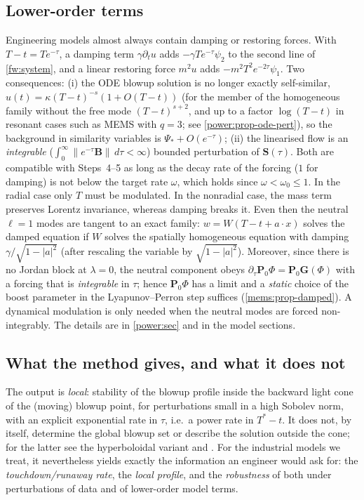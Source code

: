 \subsection{Lower-order terms}\label{fw:subsec-lower}
Engineering models almost always contain damping or restoring forces. With
$T-t=Te^{-\tau}$, a damping term $\gamma\partial_tu$ adds
$-\gamma Te^{-\tau}\psi_2$ to the second line of \eqref{fw:system}, and a
linear restoring force $m^2u$ adds $-m^2T^2e^{-2\tau}\psi_1$. Two
consequences: (i) the ODE blowup solution is no longer exactly self-similar,
$u(t)=\kappa(T-t)^{-s}(1+O(T-t))$ (for the member of the homogeneous family
without the free mode $(T-t)^{s+2}$, and up to a factor $\log(T-t)$ in
resonant cases such as MEMS with $q=3$; see \cref{power:prop-ode-pert}), so
the background in similarity variables is $\Psi_*+O(e^{-\tau})$; (ii) the linearised flow is an \emph{integrable}
($\int_0^\infty\|e^{-\tau}\mathbf B\|\,d\tau<\infty$) bounded perturbation of
$\mathbf S(\tau)$. Both are compatible with Steps~4--5 as long as the decay rate
of the forcing ($1$ for damping) is not below the target rate $\omega$, which
holds since $\omega<\omega_0\le1$. In the radial case only $T$ must be
modulated. In the nonradial case, the mass term preserves Lorentz
invariance, whereas damping breaks it. Even then the neutral $\ell=1$ modes
are tangent to an exact family: $w=W(T-t+a\cdot x)$ solves the damped
equation if $W$ solves the spatially homogeneous equation with damping
$\gamma/\sqrt{1-|a|^2}$ (after rescaling the variable by $\sqrt{1-|a|^2}$).
Moreover, since there is no Jordan block at $\lambda=0$, the neutral
component obeys $\partial_\tau\mathbf P_0\Phi=\mathbf P_0\mathbf G(\Phi)$
with a forcing that is \emph{integrable} in $\tau$; hence $\mathbf P_0\Phi$
has a limit and a \emph{static} choice of the boost parameter in the
Lyapunov--Perron step suffices (\cref{mems:prop-damped}). A dynamical
modulation is only needed when the neutral modes are forced
non-integrably. The details are in \cref{power:sec} and in the model
sections.

\subsection{What the method gives, and what it does not}
The output is \emph{local}: stability of the blowup profile inside the
backward light cone of the (moving) blowup point, for perturbations small in
a high Sobolev norm, with an explicit exponential rate in $\tau$, i.e.\ a
power rate in $T^*-t$. It does not, by itself, determine the global blowup
set or describe the solution outside the cone; for the latter see the
hyperboloidal variant \cite{BiernatDonningerSchoerkhuber2021} and
\cite{ChenEtAl2024}. For the industrial models
we treat, it nevertheless yields exactly the information an engineer would
ask for: the \emph{touchdown/runaway rate}, the \emph{local profile}, and the
\emph{robustness} of both under perturbations of data and of lower-order
model terms.
